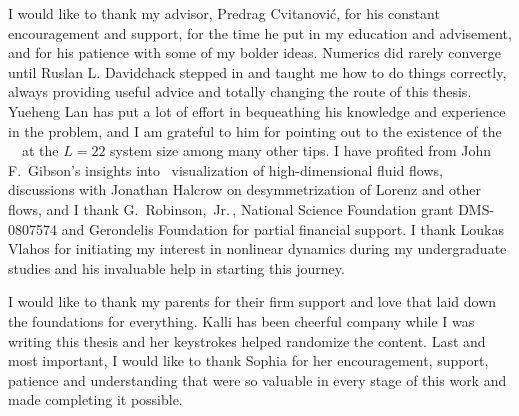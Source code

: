 
I would like to thank my advisor, Predrag Cvitanovi\'c,
for his constant encouragement and support, for the
time he put in my education and advisement, and for his patience with
some of my bolder ideas.
Numerics did rarely converge until Ruslan L. Davidchack stepped in
and taught me how to do things correctly, always providing
useful advice and totally changing the route of this thesis.
Yueheng Lan has put a lot of effort in bequeathing his knowledge
and experience in the problem, and I am grateful to him for pointing out to the
existence of the ~\eqv\ at the $L=22$ system size among many
other tips. I have
profited from John F.~Gibson's insights into \statesp\
visualization of high-dimensional fluid flows,
discussions with
Jonathan Halcrow on desymmetrization of Lorenz and other
flows, and
I thank
G.~Robinson,~Jr.\,, National Science Foundation grant
DMS-0807574 and Gerondelis Foundation
for partial financial support. I thank Loukas Vlahos for
initiating my interest in nonlinear dynamics during my
undergraduate studies and his invaluable help in starting this journey.

I would like to thank my parents for their firm support and love that
laid down the foundations for everything. Kalli has been cheerful company while I was
writing this thesis and her keystrokes helped randomize the content.
%
Last and most important, I would like to thank Sophia for her
encouragement, support, patience and understanding that were
so valuable in every stage of this work and made completing
it possible.
